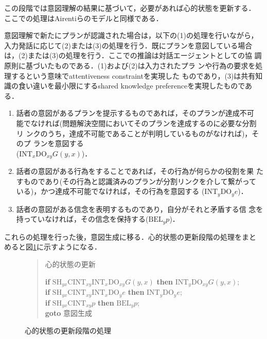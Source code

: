 この段階では意図理解の結果に基づいて，必要があれば心的状態を更新する．
ここでの処理はAirentiらのモデルと同様である．

意図理解で新たにプランが認識された場合は，以下の(1)の処理を行いながら，
入力発話に応じて(2)または(3)の処理を行う．既にプランを意図している場合
は，(2)または(3)の処理を行う．ここでの推論は対話エージェントとしての協
調原則\cite{allen95}に基づいたものである．(1)および(2)は入力されたプラ
ンや行為の要求を処理するという意味でattentiveness constraintを実現した
ものであり，(3)は共有知識の食い違いを最小限にするshared knowledge
preferenceを実現したものである．

\begin{enumerate}

\item 話者の意図があるプランを提示するものであれば，そのプランが達成不可
能でなければ(問題解決空間においてそのプランを達成するのに必要な分割リ
ンクのうち，達成不可能であることが判明しているものがなければ)，そのプ
ランを意図する\\($\mbox{INT}_x \mbox{DO}_{xy} G(y,x)$)．

\item 話者の意図がある行為をすることであれば，その行為が何らかの役割を果
たすものであり(その行為と認識済みのプランが分割リンクを介して繋がって
いる)，かつ達成不可能でなければ，その行為を意図する
($\mbox{INT}_y \mbox{DO}_y e$)．

\item 話者の意図がある信念を表明するものであり，自分がそれと矛盾する信
念を持っていなければ，その信念を保持する($\mbox{BEL}_y p$)．

\end{enumerate}

これらの処理を行った後，意図生成に移る．心的状態の更新段階の処理をまと
めると図\ref{step3}に示すようになる．

\begin{figure}[htbp]
\begin{quote}
\noindent
{\dg 心的状態の更新}

\noindent
{\bf if} $\mbox{SH}_{yx}\mbox{CINT}_{xy} \mbox{INT}_x
 \mbox{DO}_{xy} G(y,x)$
{\bf then} $\mbox{INT}_y \mbox{DO}_{xy} G(y,x)$;\\
{\bf if}   $\mbox{SH}_{yx}\mbox{CINT}_{xy} \mbox{INT}_x
 \mbox{DO}_y e$
{\bf then}   $\mbox{INT}_y \mbox{DO}_y e$;\\
{\bf if}   $\mbox{SH}_{yx}\mbox{CINT}_{xy} p$
{\bf then}   $\mbox{BEL}_y p$;\\
{\bf goto}   意図生成
\end{quote}

\caption{心的状態の更新段階の処理}
\label{step3}
\end{figure}

